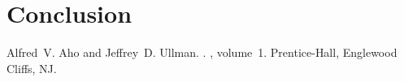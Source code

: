 \documentclass[11pt]{article}
\begin{document}
\section{Conclusion}

\begin{thebibliography}{}

Alfred~V. Aho and Jeffrey~D. Ullman.
.
, volume~1.
\newblock Prentice-{Hall}, Englewood Cliffs, NJ.


\end{thebibliography}
\end{document}
